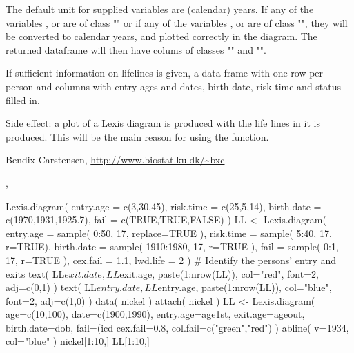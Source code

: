 \begin{Details}\relax
The default unit for supplied variables are (calendar) years.
If any of the variables ,  or
 are of class "" or if any of the variables
,  or  are of class
"", they will be converted to calendar years, and plotted
correctly in the diagram. The returned dataframe will then have colums of
classes "" and  "".
\end{Details}
\begin{Value}
If sufficient information on lifelines is given, a data frame with
one row per person and columns with entry ages and dates, birth date,
risk time and status filled in.

Side effect: a plot of a Lexis diagram is produced with the life lines
in it is produced. This will be the main reason for using the
function.
\end{Value}
\begin{Author}\relax
Bendix Carstensen,
\url{http://www.biostat.ku.dk/~bxc}
\end{Author}
\begin{SeeAlso}\relax
{},
\end{SeeAlso}
\begin{Examples}
\begin{ExampleCode}
Lexis.diagram( entry.age = c(3,30,45),
               risk.time = c(25,5,14),
              birth.date = c(1970,1931,1925.7),
                    fail = c(TRUE,TRUE,FALSE) )
LL <- Lexis.diagram( entry.age = sample( 0:50, 17, replace=TRUE ),
                     risk.time = sample( 5:40, 17, r=TRUE),
                    birth.date = sample( 1910:1980, 17, r=TRUE ),
                          fail = sample( 0:1, 17, r=TRUE ), 
                      cex.fail = 1.1,
                      lwd.life = 2 )
# Identify the persons' entry and exits
text( LL$exit.date, LL$exit.age, paste(1:nrow(LL)), col="red", font=2, adj=c(0,1) )
text( LL$entry.date, LL$entry.age, paste(1:nrow(LL)), col="blue", font=2, adj=c(1,0) )
data( nickel )
attach( nickel )
LL <- Lexis.diagram( age=c(10,100), date=c(1900,1990), 
                     entry.age=age1st, exit.age=ageout, birth.date=dob, 
                     fail=(icd %
                     cex.fail=0.8, col.fail=c("green","red") )
abline( v=1934, col="blue" )
nickel[1:10,]
LL[1:10,]
\end{ExampleCode}
\end{Examples}

